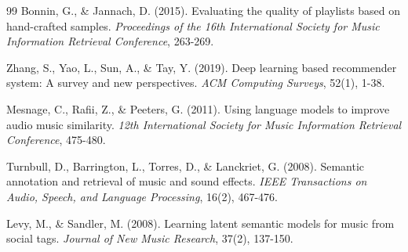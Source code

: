 \documentclass[12pt,a4paper]{article}
\begin{document}
\begin{thebibliography}{99}
Bonnin, G., \& Jannach, D. (2015). Evaluating the quality of playlists based on hand-crafted samples. \textit{Proceedings of the 16th International Society for Music Information Retrieval Conference}, 263-269.

Zhang, S., Yao, L., Sun, A., \& Tay, Y. (2019). Deep learning based recommender system: A survey and new perspectives. \textit{ACM Computing Surveys}, 52(1), 1-38.

Mesnage, C., Rafii, Z., \& Peeters, G. (2011). Using language models to improve audio music similarity. \textit{12th International Society for Music Information Retrieval Conference}, 475-480.

Turnbull, D., Barrington, L., Torres, D., \& Lanckriet, G. (2008). Semantic annotation and retrieval of music and sound effects. \textit{IEEE Transactions on Audio, Speech, and Language Processing}, 16(2), 467-476.

Levy, M., \& Sandler, M. (2008). Learning latent semantic models for music from social tags. \textit{Journal of New Music Research}, 37(2), 137-150.

\end{thebibliography}
\end{document}
